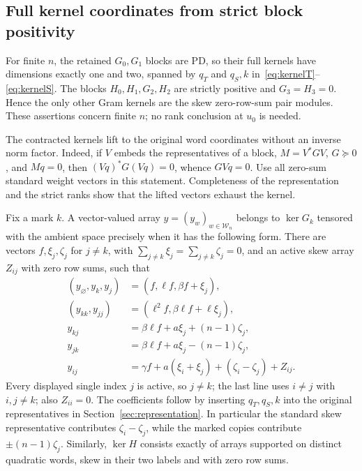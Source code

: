 \documentclass[11pt]{article}
\newcommand{\W}{\mathcal W}
\begin{document}
\subsection{Full kernel coordinates from strict block positivity}
For finite $n$, the retained $G_0,G_1$ blocks are PD, so their full
kernels have dimensions exactly one and two, spanned by
$q_T$ and $q_S,k$ in~\eqref{eq:kernelT}--\eqref{eq:kernelS}.
The blocks $H_0,H_1,G_2,H_2$ are strictly positive and $G_3=H_3=0$.
Hence the only other Gram kernels are the skew zero-row-sum pair modules.
These assertions concern finite $n$; no rank conclusion at $u_0$ is needed.

The contracted kernels lift to the original word coordinates without an
inverse norm factor. Indeed, if $V$ embeds the representatives of a
block, $M=V^*GV$, $G\succeq0$, and $Mq=0$, then
$(Vq)^*G(Vq)=0$, whence $GVq=0$. Use all zero-sum standard weight
vectors in this statement. Completeness of the representation and the
strict ranks show that the lifted vectors exhaust the kernel.

Fix a mark $k$. A vector-valued array $y=(y_w)_{w\in\W_n}$ belongs
to $\ker G_k$ tensored with the ambient space precisely when it has
the following form. There are vectors $f,\xi_j,\zeta_j$ for $j\ne k$,
with $\sum_{j\ne k}\xi_j=\sum_{j\ne k}\zeta_j=0$, and an active
skew array $Z_{ij}$ with zero row sums, such that
\begin{align}
 (y_{\varnothing},y_k,y_j)&=(f,\ell f,\beta f+\xi_j),\nonumber\\
 (y_{kk},y_{jj})&=(\ell^2f,\beta\ell f+\ell\xi_j),\nonumber\\
 y_{kj}&=\beta\ell f+a\xi_j+(n-1)\zeta_j,\nonumber\\
 y_{jk}&=\beta\ell f+a\xi_j-(n-1)\zeta_j,\nonumber\\
 y_{ij}&=\gamma f+a(\xi_i+\xi_j)+(\zeta_i-\zeta_j)+Z_{ij}.
 \label{eq:full-kernel}
\end{align}
Every displayed single index $j$ is active, so $j\ne k$; the last line uses
$i\ne j$ with $i,j\ne k$; also $Z_{ii}=0$.
The coefficients follow by inserting $q_T,q_S,k$ into the original
representatives in Section~\ref{sec:representation}. In particular the
standard skew representative contributes $\zeta_i-\zeta_j$, while
the marked copies contribute $\pm(n-1)\zeta_j$.
Similarly, $\ker H$ consists exactly of arrays supported on distinct
quadratic words, skew in their two labels and with zero row sums.
\end{document}
